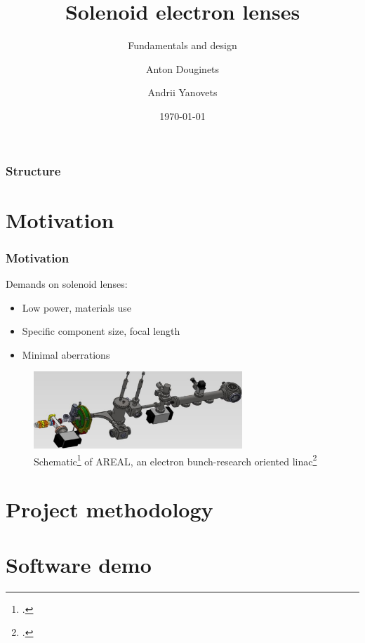 \documentclass[10pt]{beamer}
\title{Solenoid electron lenses}
\subtitle{Fundamentals and design}
\author{Anton Douginets \and Andrii Yanovets}
\date{\today}
\newcommand{\rfn}{\setcounter{footnote}{0}}
\begin{document}
\begin{frame}[plain]
  \titlepage
\end{frame}

\begin{frame}
  \frametitle{Structure}
  \tableofcontents%
\end{frame}

\section{Motivation}

\begin{frame}
  \frametitle{Motivation}
  \rfn
  Demands on solenoid lenses:
  \begin{itemize}
    \item Low power, materials use
    \item Specific component size, focal length
    \item Minimal aberrations
  \end{itemize}
  \vspace{0.5cm}
  \begin{figure}
  \centering
    \includegraphics[width=0.7\textwidth]{AREAL}
    \caption{Schematic\footcite{AREALRF} of AREAL, an electron bunch-research oriented linac\footcite{AREAL}}

  \end{figure}
\end{frame}


%

\section{Project methodology}



\section{Software demo}

\end{document}
